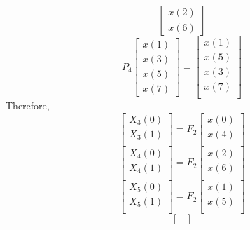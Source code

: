 \documentclass[journal,12pt,twocolumn]{IEEEtran}
\renewcommand\thesection{\arabic{section}}
\begin{document}
\begin{enumerate}[label=\arabic*.,ref=\thesection.\theenumi]
\begin{equation}
\begin{bmatrix}
x(2) \\
x(6)
\end{bmatrix}
\end{equation}
\begin{equation}
P_{4}
\begin{bmatrix}
x(1) \\ 
x(3) \\ 
x(5) \\
x(7)
\end{bmatrix}
 = 
\begin{bmatrix}
x(1) \\ 
x(5) \\ 
x(3) \\ 
x(7) \\
\end{bmatrix}
\end{equation}
Therefore,
\begin{equation}
\begin{bmatrix}
X_{3}(0) \\ 
X_{3}(1)\\ 
\end{bmatrix}
= F_{2}
\begin{bmatrix}
x(0) \\ 
x(4) \\ 
\end{bmatrix}
\end{equation}
\begin{equation}
\begin{bmatrix}
X_{4}(0) \\ 
X_{4}(1)\\ 
\end{bmatrix}
= F_{2}
\begin{bmatrix}
x(2) \\ 
x(6) \\ 
\end{bmatrix}
\end{equation}
\begin{equation}
\begin{bmatrix}
X_{5}(0) \\ 
X_{5}(1)\\ 
\end{bmatrix}
= F_{2}
\begin{bmatrix}
x(1) \\ 
x(5) \\ 
\end{bmatrix}
\end{equation}
\begin{equation}
\begin{bmatrix}

\end{bmatrix}
\end{equation}
\end{enumerate}
\end{document}

